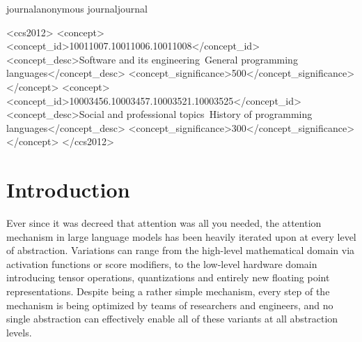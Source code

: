 \documentclass[review, anonymous, sigplan]{acmart}
\def\acmversionanonymous{anonymous}
\def\acmversionjournal{journal}
\def\acmversion{anonymous}
\def\acmversion{journal}
\begin{document}
\ifx\acmversion\acmversionanonymous
{} %
\renewcommand\footnotetextcopyrightpermission[1]{} %
\fi
\ifx\acmversion\acmversionjournal
\begin{CCSXML}
<ccs2012>
<concept>
<concept_id>10011007.10011006.10011008</concept_id>
<concept_desc>Software and its engineering~General programming languages</concept_desc>
<concept_significance>500</concept_significance>
</concept>
<concept>
<concept_id>10003456.10003457.10003521.10003525</concept_id>
<concept_desc>Social and professional topics~History of programming languages</concept_desc>
<concept_significance>300</concept_significance>
</concept>
</ccs2012>
\end{CCSXML}


\fi

\maketitle

\section{Introduction}

Ever since it was decreed that attention was all you needed, the attention mechanism in large language models has been heavily iterated upon at every level of abstraction. Variations can range from the high-level mathematical domain via activation functions or score modifiers, to the low-level hardware domain introducing tensor operations, quantizations and entirely new floating point representations. Despite being a rather simple mechanism, every step of the mechanism is being optimized by teams of researchers and engineers, and no single abstraction can effectively enable all of these variants at all abstraction levels.
\end{document}
